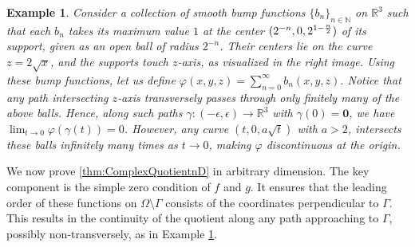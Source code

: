 \documentclass{article}
\newcommand{\Albert}[1]{{\color[rgb]{0.2,0.4,0.8}\textbf{Albert: } #1}}
\theoremstyle{theorem}
\newtheorem{example}{Example}
\theoremstyle{definition}
\def\NN{\mathbb{N}}
\def\RR{\mathbb{R}}
\begin{document}
\begin{example}\label{eg:infinite_bump_functions}
    Consider a collection of smooth bump functions $\{b_n\}_{n\in \NN}$ on $\RR^3$ such that each $b_n$ takes its maximum value $1$ at the center $(2^{-n},0, 2^{1-{n\over 2}})$ of its support, given as an open ball of radius $2^{-n}$. Their centers lie on the curve $z=2\sqrt{x}$, and the supports touch $z$-axis, as visualized in the right image.
    Using these bump functions, let us define $\varphi(x,y,z)= \sum_{n=0}^\infty b_n(x,y,z)$. 
    Notice that any path intersecting $z$-axis transversely passes through only finitely many of the above balls. Hence, along such paths $\gamma:(-\epsilon,\epsilon)\to \RR^3$ with $\gamma(0) = \mathbf{0}$, we have $\lim_{t\to0} \varphi(\gamma(t))=0$. However, any curve $(t,0,a \sqrt{t})$ with $a>2$, intersects these balls infinitely many times as $t\to 0$, making $\varphi$ discontinuous at the origin.
\end{example}
 \endgroup
 We now prove \autoref{thm:ComplexQuotientnD} in arbitrary dimension. The key component is the simple zero condition of $f$ and $g$. It ensures that the leading order of these functions on $\Omega\setminus \Gamma$ consists of the coordinates perpendicular to $\Gamma$. This results in the continuity of the quotient along any path approaching to $\Gamma$, possibly non-transversely, as in Example \ref{eg:infinite_bump_functions}.
\end{document}
